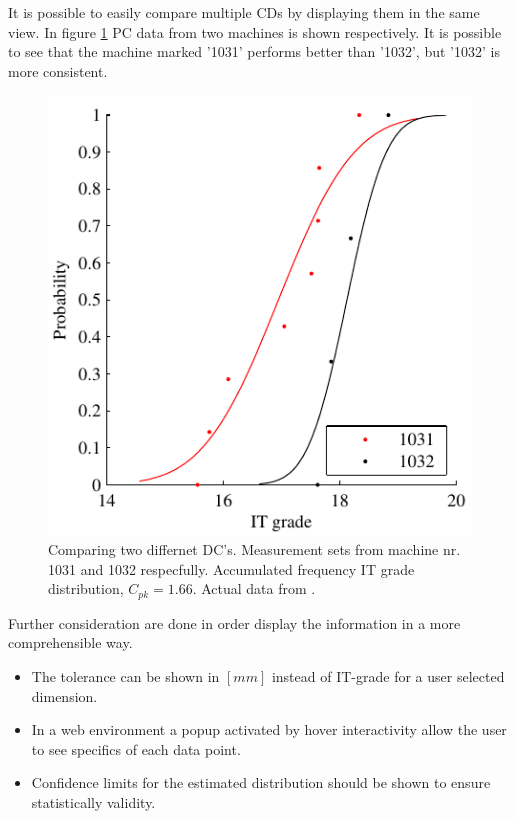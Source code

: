 \documentclass[aip,amsmath, reprint, author-year]{revtex4-1}
\begin{document}
It is possible to easily compare multiple CDs by displaying them in the same view. In figure \ref{fig:acumfreqF3} PC data from two machines is shown respectively. It is possible to see that the machine marked '1031' performs better than '1032', but '1032' is more consistent.

\begin{figure}
\includegraphics{Acum_freqF3.pdf}
\caption{\label{fig:acumfreqF3} Comparing two differnet DC's. Measurement sets from machine nr. 1031 and 1032 respecfully. Accumulated frequency IT grade distribution, $C_{pk} =1.66$. Actual data from \cite{thornton2000use}. }
\end{figure}

Further consideration are done in order display the information in a more comprehensible way.
\begin{itemize}
\item The tolerance can be shown in $[mm]$ instead of IT-grade for a user selected dimension.
\item In a web environment a popup activated by hover interactivity allow the user to see specifics of each data point.
\item Confidence limits for the estimated distribution should be shown to ensure statistically validity.
\end{itemize}
\end{document}
